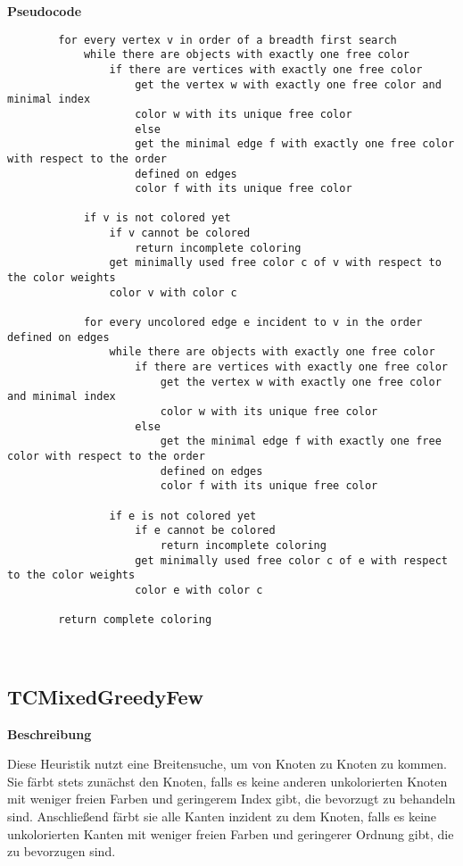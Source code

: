 \documentclass{article}
\begin{document}
	\textbf{Pseudocode}
	\begin{verbatim}
		for every vertex v in order of a breadth first search
		    while there are objects with exactly one free color
		        if there are vertices with exactly one free color
		            get the vertex w with exactly one free color and minimal index
		            color w with its unique free color
			        else
		            get the minimal edge f with exactly one free color with respect to the order
		            defined on edges
		            color f with its unique free color
		
		    if v is not colored yet
		        if v cannot be colored
		            return incomplete coloring
		        get minimally used free color c of v with respect to the color weights
		        color v with color c
			    
		    for every uncolored edge e incident to v in the order defined on edges
		        while there are objects with exactly one free color
		            if there are vertices with exactly one free color
		                get the vertex w with exactly one free color and minimal index
		                color w with its unique free color
		            else
		                get the minimal edge f with exactly one free color with respect to the order 
		                defined on edges
		                color f with its unique free color
				    
		        if e is not colored yet
		            if e cannot be colored
		                return incomplete coloring
		            get minimally used free color c of e with respect to the color weights
		            color e with color c
				        
		return complete coloring
	\end{verbatim}
	
	~\newpage
	
	\subsection{TCMixedGreedyFew}
	
	\textbf{Beschreibung}
	
	Diese Heuristik nutzt eine Breitensuche, um von Knoten zu Knoten zu kommen. Sie färbt stets zunächst den Knoten, falls es keine anderen unkolorierten Knoten mit weniger freien Farben und geringerem Index gibt, die bevorzugt zu behandeln sind. Anschließend färbt sie alle Kanten inzident zu dem Knoten, falls es keine unkolorierten Kanten mit weniger freien Farben und geringerer Ordnung gibt, die zu bevorzugen sind.
	
\end{document}
